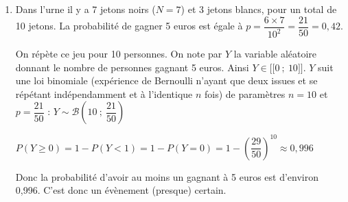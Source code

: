 \documentclass[10pt]{article}
\providecommand{\llbracket}{\lbrack\!\lbrack}
\providecommand{\rrbracket}{\rbrack\!\rbrack}
\begin{document}
\begin{enumerate}
\begin{enumerate}
$\dfrac{-36N + 252}{(N + 3)^2}=\dfrac{-36(N - 7)}{(N + 3)^2}$

 $f'(N)=0 \iff N=7$.

 Le gain moyen du joueur est maximal lorsque dans l'urne il y a 7 jetons noirs et 3 jetons blancs.
\end{enumerate}
\item Dans l'urne il y a 7 jetons noirs ($N=7$) et 3 jetons blancs, pour un total de 10 jetons. La probabilité de gagner 5 euros est égale à $p=\dfrac{6\times7}{10^2}=\dfrac{21}{50}=0,42$.

On répète ce jeu pour 10 personnes. On note par $Y$ la variable aléatoire donnant le nombre de personnes gagnant 5 euros. Ainsi $Y \in \llbracket0~;~10 \rrbracket$. $Y$ suit une loi binomiale (expérience de Bernoulli n'ayant que deux issues et se répétant indépendamment et à l'identique $n$ fois) de paramètres $n=10$ et $p=\dfrac{21}{50}$ : $Y \sim \mathcal{B}\left(10~;~\dfrac{21}{50}\right)$

$P(Y\geqslant0)=1-P(Y<1)=1-P(Y=0)=1-\left(\dfrac{29}{50}\right)^{10}\approx 0,996$

Donc la probabilité d'avoir au moins un gagnant à 5 euros est d'environ 0,996. C'est donc un évènement (presque) certain.
\end{enumerate}
\end{document}

